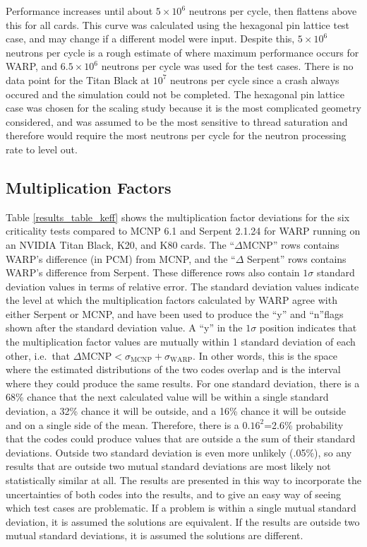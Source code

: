 \documentclass[preprint,12pt]{elsarticle}
\begin{document}
Performance increases until about $5\times10^6$ neutrons per cycle, then flattens above this for all cards.  This curve was calculated using the hexagonal pin lattice test case, and may change if a different model were input.  Despite this, $5\times10^6$ neutrons per cycle is a rough estimate of where maximum performance occurs for WARP, and $6.5\times10^6$ neutrons per cycle was used for the test cases.  There is no data point for the Titan Black at $10^7$ neutrons per cycle since a crash always occured and the simulation could not be completed.  The hexagonal pin lattice case was chosen for the scaling study because it is the most complicated geometry considered, and was assumed to be the most sensitive to thread saturation and therefore would require the most neutrons per cycle for the neutron processing rate to level out.  

\subsection{Multiplication Factors}

Table \ref{results_table_keff} shows the multiplication factor deviations for the six criticality tests compared to MCNP 6.1 and Serpent 2.1.24 for WARP running on an NVIDIA Titan Black, K20, and K80 cards.  The ``$\Delta$MCNP'' rows contains WARP's difference (in PCM) from MCNP, and the ``$\Delta$ Serpent'' rows contains WARP's difference from Serpent.  These difference rows also contain $1\sigma$ standard deviation values in terms of relative error. The standard deviation values indicate the level at which the multiplication factors calculated by WARP agree with either Serpent or MCNP, and have been used to produce the ``y'' and ``n''flags shown after the standard deviation value.  A ``y'' in the $1\sigma$ position indicates that the multiplication factor values are mutually within 1 standard deviation of each other, i.e.\ that $\Delta \textrm{MCNP}<\sigma_{\textrm{MCNP}}+\sigma_{\textrm{WARP}}$.  In other words, this is the space where the estimated distributions of the two codes overlap and is the interval where they could produce the same results.  For one standard deviation, there is a 68\% chance that the next calculated value will be within a single standard deviation, a 32\% chance it will be outside, and a 16\% chance it will be outside and on a single side of the mean.  Therefore, there is a $0.16^2$=2.6\% probability that the codes could produce values that are outside a the sum of their standard deviations.  Outside two standard deviation is even more unlikely (.05\%), so any results that are outside two mutual standard deviations are most likely not statistically similar at all.  The results are presented in this way to incorporate the uncertainties of both codes into the results, and to give an easy way of seeing which test cases are problematic.  If a problem is within a single mutual standard deviation, it is assumed the solutions are equivalent.  If the results are outside two mutual standard deviations, it is assumed the solutions are different.
\end{document}
